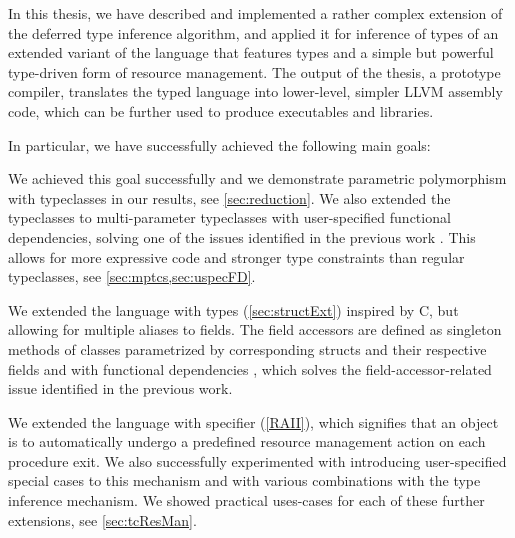 

In this thesis, we have described and implemented a rather complex extension of the deferred type inference algorithm, and applied it for inference of types of an extended variant of the \cmm language that features types and a simple but powerful type-driven form of resource management. The output of the thesis, a prototype compiler\cmmrepo, translates the typed \cmm language into lower-level, simpler LLVM assembly code, which can be further used to produce executables and libraries.

In particular, we have successfully achieved the following main goals:

\begin{description}
    \small
    \item[Extend \cmm with parametric polymorphism with typeclasses] We achieved this goal successfully and we demonstrate parametric polymorphism with typeclasses in our results, see \cref{sec:reduction}. We also extended the typeclasses to multi-parameter typeclasses with user-specified functional dependencies, solving one of the issues identified in the previous work \cite{klepl2020type}. This allows for more expressive code and stronger type constraints than regular typeclasses, see \cref{sec:mptcs,sec:uspecFD}.

    \item[Extend \cmm with record types]  We extended the language with  types (\cref{sec:structExt}) inspired by C, but allowing for multiple aliases to fields. The field accessors are defined as singleton methods of classes parametrized by corresponding structs and their respective fields and with functional dependencies , which solves the field-accessor-related issue identified in the previous work.

    \item[Extend \cmm with automatic resource management features] We extended the language with  specifier (\cref{RAII}), which signifies that an object is to automatically undergo a predefined resource management action on each procedure exit. We also successfully experimented with introducing user-specified special cases to this mechanism and with various combinations with the type inference mechanism. We showed practical uses-cases for each of these further extensions, see \cref{sec:tcResMan}.

    \item[The solution should simplify implementation of low-level software] 


\end{description}
